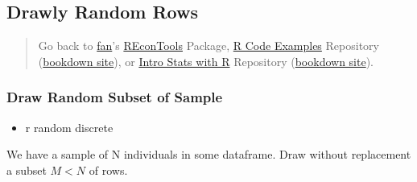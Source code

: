 \documentclass[
]{book}
\providecommand{\tightlist}{%
  \setlength{\itemsep}{0pt}\setlength{\parskip}{0pt}}
\begin{document}
\hypertarget{drawly-random-rows}{%
\subsection{Drawly Random Rows}\label{drawly-random-rows}}

\begin{quote}
Go back to \href{http://fanwangecon.github.io/}{fan}'s \href{https://fanwangecon.github.io/REconTools/}{REconTools} Package, \href{https://fanwangecon.github.io/R4Econ/}{R Code Examples} Repository (\href{https://fanwangecon.github.io/R4Econ/bookdown}{bookdown site}), or \href{https://fanwangecon.github.io/Stat4Econ/}{Intro Stats with R} Repository (\href{https://fanwangecon.github.io/Stat4Econ/bookdown}{bookdown site}).
\end{quote}

\hypertarget{draw-random-subset-of-sample}{%
\subsubsection{Draw Random Subset of Sample}\label{draw-random-subset-of-sample}}

\begin{itemize}
\tightlist
\item
  r random discrete
\end{itemize}

We have a sample of N individuals in some dataframe. Draw without replacement a subset \(M<N\) of rows.
\end{document}
